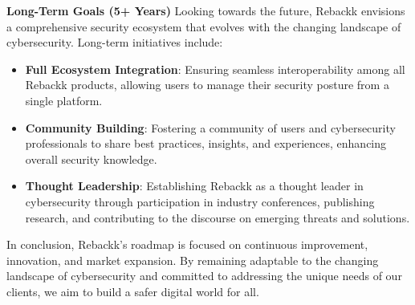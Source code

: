 \textbf{Long-Term Goals (5+ Years)}  
Looking towards the future, Rebackk envisions a comprehensive security ecosystem that evolves with the changing landscape of cybersecurity. Long-term initiatives include:

\begin{itemize}
    \item \textbf{Full Ecosystem Integration}: Ensuring seamless interoperability among all Rebackk products, allowing users to manage their security posture from a single platform.
    \item \textbf{Community Building}: Fostering a community of users and cybersecurity professionals to share best practices, insights, and experiences, enhancing overall security knowledge.
    \item \textbf{Thought Leadership}: Establishing Rebackk as a thought leader in cybersecurity through participation in industry conferences, publishing research, and contributing to the discourse on emerging threats and solutions.
\end{itemize}

In conclusion, Rebackk's roadmap is focused on continuous improvement, innovation, and market expansion. By remaining adaptable to the changing landscape of cybersecurity and committed to addressing the unique needs of our clients, we aim to build a safer digital world for all.